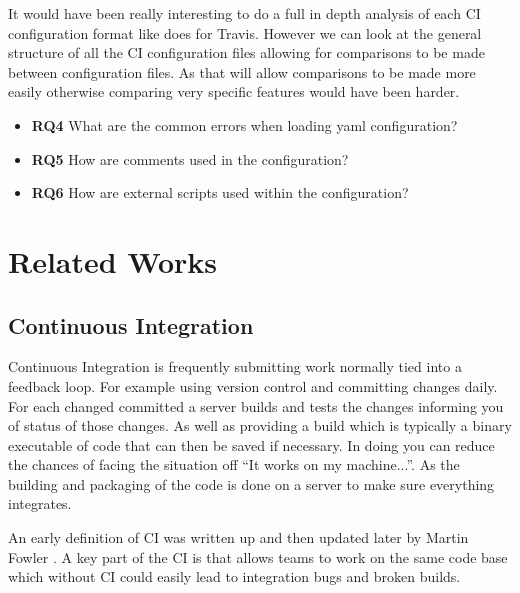 \documentclass[10pt,conference]{IEEEtran}
\begin{document}
It would have been really interesting to do a full in depth analysis of each CI configuration format like \citet{Gallaba2018} does for Travis. However we can look at the general structure of all the CI configuration files allowing for comparisons to be made between configuration files. As that will allow comparisons to be made more easily otherwise comparing very specific features would have been harder.
\begin{itemize}
  \item \textbf{RQ4} What are the common errors when loading yaml configuration?
  \item \textbf{RQ5} How are comments used in the configuration?
  \item \textbf{RQ6} How are external scripts used within the configuration?
\end{itemize}

\section{Related Works}
\vspace*{-0.05in}
\subsection{Continuous Integration}
\vspace*{-0.05in}

Continuous Integration is frequently submitting work normally tied into a feedback loop. For example using version control and committing changes daily. For each changed committed a server builds and tests the changes informing you of status of those changes. As well as providing a build which is typically a binary executable of code that can then be saved if necessary. In doing you can reduce the chances of facing the situation off \enquote{It works on my machine...}. As the building and packaging of the code is done on a server to make sure everything integrates.

An early definition of CI was written up and then updated later by Martin Fowler \cite{CI2010_MartinFowler}. A key part of the CI is that allows teams to work on the same code base which without CI could easily lead to integration bugs and broken builds. 
\end{document}
